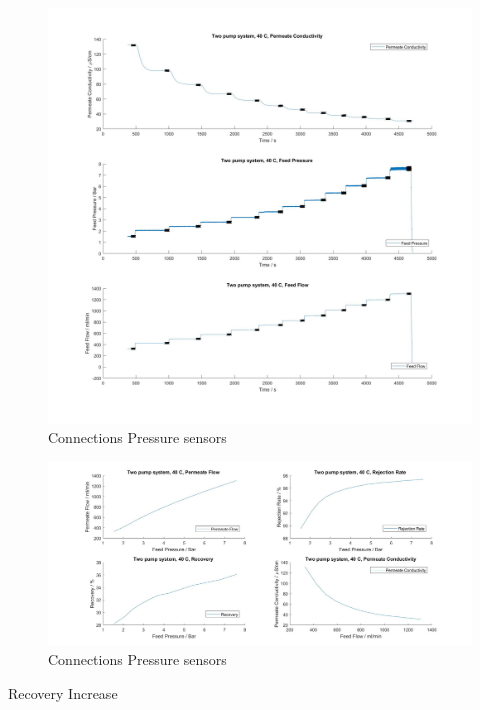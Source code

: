 \begin{figure}[H]
    \centering
    \includegraphics[width=1.1\textwidth]{FeedPumpIncrease40}
    \caption{Connections Pressure sensors}
    \label{fig:PressConn}
\end{figure}


\begin{figure}[H]
    \centering
    \includegraphics[width=1.1\textwidth]{FeedPumpIncrease40Key}
    \caption{Connections Pressure sensors}
    \label{fig:PressConn}
\end{figure}

Recovery Increase

